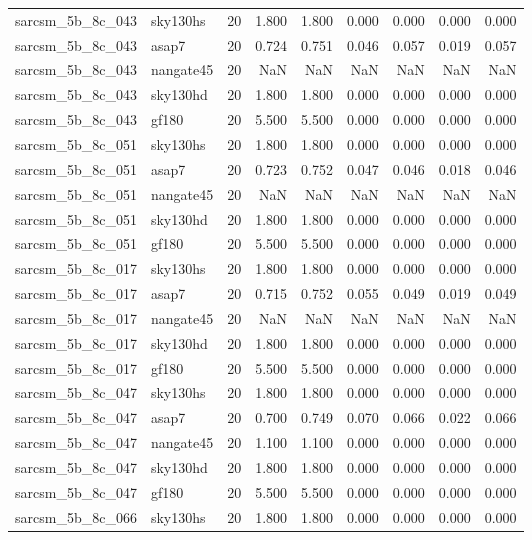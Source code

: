 \begin{tabular}{llrrrrrrr}
sarcsm\_5b\_8c\_043 & sky130hs & 20 & 1.800 & 1.800 & 0.000 & 0.000 & 0.000 & 0.000 \\
sarcsm\_5b\_8c\_043 & asap7 & 20 & 0.724 & 0.751 & 0.046 & 0.057 & 0.019 & 0.057 \\
sarcsm\_5b\_8c\_043 & nangate45 & 20 & NaN & NaN & NaN & NaN & NaN & NaN \\
sarcsm\_5b\_8c\_043 & sky130hd & 20 & 1.800 & 1.800 & 0.000 & 0.000 & 0.000 & 0.000 \\
sarcsm\_5b\_8c\_043 & gf180 & 20 & 5.500 & 5.500 & 0.000 & 0.000 & 0.000 & 0.000 \\
sarcsm\_5b\_8c\_051 & sky130hs & 20 & 1.800 & 1.800 & 0.000 & 0.000 & 0.000 & 0.000 \\
sarcsm\_5b\_8c\_051 & asap7 & 20 & 0.723 & 0.752 & 0.047 & 0.046 & 0.018 & 0.046 \\
sarcsm\_5b\_8c\_051 & nangate45 & 20 & NaN & NaN & NaN & NaN & NaN & NaN \\
sarcsm\_5b\_8c\_051 & sky130hd & 20 & 1.800 & 1.800 & 0.000 & 0.000 & 0.000 & 0.000 \\
sarcsm\_5b\_8c\_051 & gf180 & 20 & 5.500 & 5.500 & 0.000 & 0.000 & 0.000 & 0.000 \\
sarcsm\_5b\_8c\_017 & sky130hs & 20 & 1.800 & 1.800 & 0.000 & 0.000 & 0.000 & 0.000 \\
sarcsm\_5b\_8c\_017 & asap7 & 20 & 0.715 & 0.752 & 0.055 & 0.049 & 0.019 & 0.049 \\
sarcsm\_5b\_8c\_017 & nangate45 & 20 & NaN & NaN & NaN & NaN & NaN & NaN \\
sarcsm\_5b\_8c\_017 & sky130hd & 20 & 1.800 & 1.800 & 0.000 & 0.000 & 0.000 & 0.000 \\
sarcsm\_5b\_8c\_017 & gf180 & 20 & 5.500 & 5.500 & 0.000 & 0.000 & 0.000 & 0.000 \\
sarcsm\_5b\_8c\_047 & sky130hs & 20 & 1.800 & 1.800 & 0.000 & 0.000 & 0.000 & 0.000 \\
sarcsm\_5b\_8c\_047 & asap7 & 20 & 0.700 & 0.749 & 0.070 & 0.066 & 0.022 & 0.066 \\
sarcsm\_5b\_8c\_047 & nangate45 & 20 & 1.100 & 1.100 & 0.000 & 0.000 & 0.000 & 0.000 \\
sarcsm\_5b\_8c\_047 & sky130hd & 20 & 1.800 & 1.800 & 0.000 & 0.000 & 0.000 & 0.000 \\
sarcsm\_5b\_8c\_047 & gf180 & 20 & 5.500 & 5.500 & 0.000 & 0.000 & 0.000 & 0.000 \\
sarcsm\_5b\_8c\_066 & sky130hs & 20 & 1.800 & 1.800 & 0.000 & 0.000 & 0.000 & 0.000 \\

\end{tabular}

